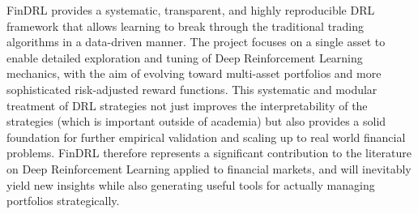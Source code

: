 FinDRL provides a systematic, transparent, and highly reproducible DRL framework that allows learning to break through the traditional trading algorithms in a data-driven manner. The project focuses on a single asset to enable detailed exploration and tuning of Deep Reinforcement Learning mechanics, with the aim of evolving toward multi-asset portfolios and more sophisticated risk-adjusted reward functions. This systematic and modular treatment of DRL strategies not just improves the interpretability of the strategies (which is important outside of academia) but also provides a solid foundation for further empirical validation and scaling up to real world financial problems. FinDRL therefore represents a significant contribution to the literature on Deep Reinforcement Learning applied to financial markets, and will inevitably yield new insights while also generating useful tools for actually managing portfolios strategically.


